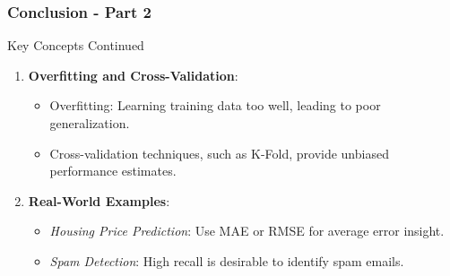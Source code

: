 \documentclass[aspectratio=169]{beamer}
\begin{document}
\begin{frame}[fragile]
    \frametitle{Conclusion - Part 2}
    \begin{block}{Key Concepts Continued}
        \begin{enumerate}[resume]
            \item \textbf{Overfitting and Cross-Validation}:
                \begin{itemize}
                    \item Overfitting: Learning training data too well, leading to poor generalization.
                    \item Cross-validation techniques, such as K-Fold, provide unbiased performance estimates.
                \end{itemize}
            \item \textbf{Real-World Examples}:
                \begin{itemize}
                    \item \textit{Housing Price Prediction}: Use MAE or RMSE for average error insight.
                    \item \textit{Spam Detection}: High recall is desirable to identify spam emails.
                \end{itemize}
        \end{enumerate}
    \end{block}
\end{frame}
\end{document}
